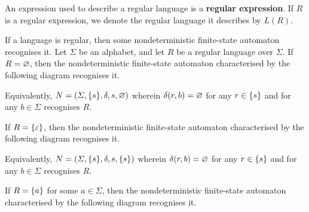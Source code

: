 An expression used to describe a regular language is a {\bf regular expression}.
If \(R\) is a regular expression, we denote the regular language it describes by
\(L(R)\).

\Blm
    \label{lem1}
    If a language is regular, then some nondeterministic finite-state automaton
    recognises it.
\Elm
\Bpr
    Let \(\varSigma\) be an alphabet, and let \(R\) be a regular language over
    \(\varSigma\). If \(R = \varnothing\), then the nondeterministic finite-state
    automaton characterised by the following diagram recognises it.
    \begin{figure}[!h]
        \centering
    \end{figure}

    \noindent Equivalently, \(N = (\varSigma, \{s\}, \delta, s, \varnothing)\)
    wherein \(\delta(r, b) = \varnothing\) for any \(r \in \{s\}\) and for any \(b
    \in \varSigma\) recognises \(R\).

    If \(R = \{\varepsilon\}\), then the nondeterministic finite-state
    automaton characterised by the following diagram recognises it.
    \begin{figure}[!h]
        \centering
    \end{figure}

    \noindent Equivalently, \(N = (\varSigma, \{s\}, \delta, s, \{s\})\)
    wherein \(\delta(r, b) = \varnothing\) for any \(r \in \{s\}\) and for any \(b
    \in \varSigma\) recognises \(R\).

    If \(R = \{a\}\) for some \(a \in \varSigma\), then the nondeterministic
    finite-state automaton characterised by the following diagram recognises it.
    \begin{figure}[!h]
        \centering
    \end{figure}

